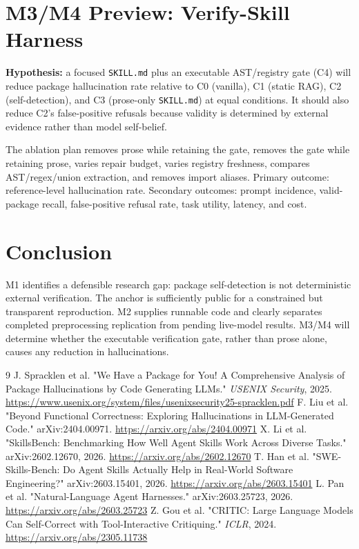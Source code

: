 \documentclass[11pt,a4paper]{article}
\begin{document}
\section{M3/M4 Preview: Verify-Skill Harness}
\textbf{Hypothesis:} a focused \texttt{SKILL.md} plus an executable AST/registry gate (C4) will reduce package hallucination rate relative to C0 (vanilla), C1 (static RAG), C2 (self-detection), and C3 (prose-only \texttt{SKILL.md}) at equal conditions. It should also reduce C2's false-positive refusals because validity is determined by external evidence rather than model self-belief.

\begin{center}
\end{center}

The ablation plan removes prose while retaining the gate, removes the gate while retaining prose, varies repair budget, varies registry freshness, compares AST/regex/union extraction, and removes import aliases. Primary outcome: reference-level hallucination rate. Secondary outcomes: prompt incidence, valid-package recall, false-positive refusal rate, task utility, latency, and cost.

\section{Conclusion}
M1 identifies a defensible research gap: package self-detection is not deterministic external verification. The anchor is sufficiently public for a constrained but transparent reproduction. M2 supplies runnable code and clearly separates completed preprocessing replication from pending live-model results. M3/M4 will determine whether the executable verification gate, rather than prose alone, causes any reduction in hallucinations.

\begin{thebibliography}{9}
 J. Spracklen et al. "We Have a Package for You! A Comprehensive Analysis of Package Hallucinations by Code Generating LLMs." \textit{USENIX Security}, 2025. \url{https://www.usenix.org/system/files/usenixsecurity25-spracklen.pdf}
 F. Liu et al. "Beyond Functional Correctness: Exploring Hallucinations in LLM-Generated Code." arXiv:2404.00971. \url{https://arxiv.org/abs/2404.00971}
 X. Li et al. "SkillsBench: Benchmarking How Well Agent Skills Work Across Diverse Tasks." arXiv:2602.12670, 2026. \url{https://arxiv.org/abs/2602.12670}
 T. Han et al. "SWE-Skills-Bench: Do Agent Skills Actually Help in Real-World Software Engineering?" arXiv:2603.15401, 2026. \url{https://arxiv.org/abs/2603.15401}
 L. Pan et al. "Natural-Language Agent Harnesses." arXiv:2603.25723, 2026. \url{https://arxiv.org/abs/2603.25723}
 Z. Gou et al. "CRITIC: Large Language Models Can Self-Correct with Tool-Interactive Critiquing." \textit{ICLR}, 2024. \url{https://arxiv.org/abs/2305.11738}
\end{thebibliography}
\end{document}
